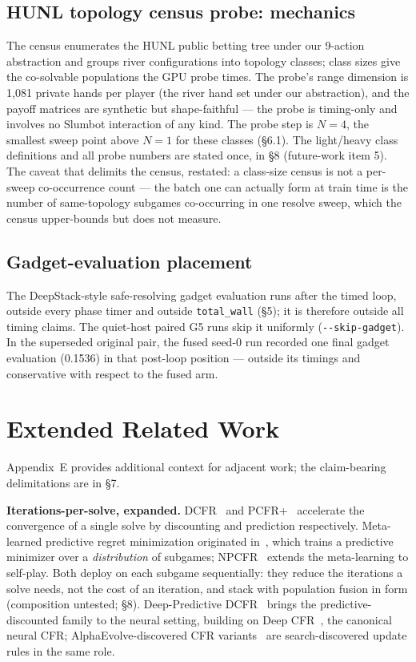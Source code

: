 \documentclass[11pt]{article}
\begin{document}
\subsection{HUNL topology census probe: mechanics}

The census enumerates the HUNL public betting tree under our 9-action abstraction and
groups river configurations into topology classes; class sizes give the co-solvable
populations the GPU probe times. The probe's range dimension is 1,081 private hands per
player (the river hand set under our abstraction), and the payoff matrices are synthetic
but shape-faithful --- the probe is timing-only and involves no Slumbot interaction of
any kind. The probe step is $N{=}4$, the smallest sweep point above $N{=}1$ for these
classes (\S6.1). The light/heavy class definitions and all probe numbers are stated
once, in \S8 (future-work item 5). The caveat that delimits the census, restated: a
class-size census is not a per-sweep co-occurrence count --- the batch one can actually
form at train time is the number of same-topology subgames co-occurring in one resolve
sweep, which the census upper-bounds but does not measure.

\subsection{Gadget-evaluation placement}

The DeepStack-style safe-resolving gadget evaluation runs after the timed loop, outside
every phase timer and outside \texttt{total\_wall} (\S5); it is therefore outside all
timing claims. The quiet-host paired G5 runs skip it uniformly
(\texttt{-{}-skip-gadget}). In the superseded original pair, the fused seed-0 run
recorded one final gadget evaluation (0.1536) in that post-loop position --- outside its
timings and conservative with respect to the fused arm.

\section{Extended Related Work}

Appendix~E provides additional context for adjacent work; the claim-bearing
delimitations are in \S7.

\textbf{Iterations-per-solve, expanded.} DCFR~\citep{BrownSandholm2019} and
PCFR+~\citep{Farina2021} accelerate the convergence of a single solve by discounting and
prediction respectively. Meta-learned predictive regret minimization originated
in~\citep{Sychrovsky2024}, which trains a predictive minimizer over a
\emph{distribution} of subgames; NPCFR~\citep{NPCFR} extends the meta-learning to
self-play. Both deploy on each subgame sequentially: they reduce the iterations a solve
needs, not the cost of an iteration, and stack with population fusion in form
(composition untested; \S8). Deep-Predictive DCFR~\citep{DeepPredictiveDCFR} brings the
predictive-discounted family to the neural setting, building on Deep
CFR~\citep{Brown2019DeepCFR}, the canonical neural CFR; AlphaEvolve-discovered CFR
variants~\citep{AlphaEvolve-CFR} are search-discovered update rules in the same role.
\end{document}
